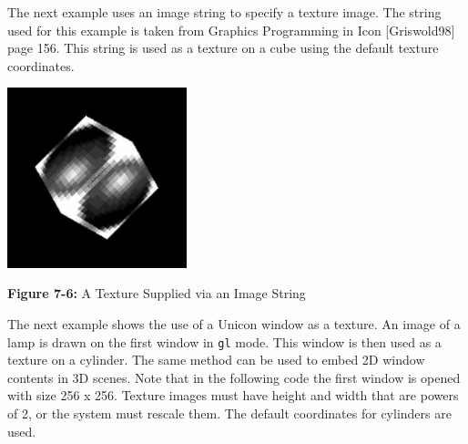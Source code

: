 The next example uses an image string to specify a texture image. The
string used for this example is taken from Graphics Programming in
Icon [Griswold98] page 156. This string is used as a texture on a cube
using the default texture coordinates.

\bigskip

{\centering 
\includegraphics[width=2.0508in,height=2.0571in]{ub-img/ub-img36.jpg}
\par}

{\sffamily\bfseries Figure 7-6:}
{\sffamily A Texture Supplied via an Image String}

\bigskip


The next example shows the use of a Unicon window as a texture. An
image of a lamp is drawn on the first window in \texttt{gl} mode. This
window is then used as a texture on a cylinder. The same method can be
used to embed 2D window contents in 3D scenes. Note that in the
following code the first window is opened with size 256 x 256. Texture
images must have height and width that are powers of 2, or the system
must rescale them. The default coordinates for cylinders are used.

